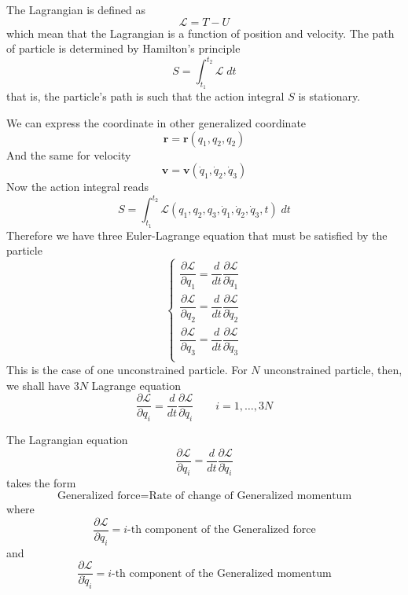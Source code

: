 \documentclass[../../../main.tex]{subfiles}
\begin{document}
The Lagrangian is defined as
\begin{equation*}
  \mathcal{L}=T-U
\end{equation*}
which mean that the Lagrangian is a function of position and velocity.
The path of particle is determined by Hamilton's principle
\begin{equation*}
  S=\int_{t_1}^{t_2}\mathcal{L}\;dt
\end{equation*}
that is, the particle's path is such that the action integral $S$ is stationary.

We can express the coordinate in other generalized coordinate
\begin{equation*}
  \mathbf{r}=\mathbf{r}(q_1,q_2,q_2)
\end{equation*}
And the same for velocity
\begin{equation*}
  \mathbf{v}=\mathbf{v}(\dot{q}_1,\dot{q}_2,\dot{q}_3)
\end{equation*}
Now the action integral reads
\begin{equation*}
  S=\int_{t_1}^{t_2}\mathcal{L}(q_1,q_2,q_3,\dot{q}_1,\dot{q}_2,\dot{q}_3,t)\;dt
\end{equation*}
Therefore we have three Euler-Lagrange equation that must be satisfied by the particle
\begin{equation*}
  \begin{cases}
    \dfrac{\partial \mathcal{L}}{\partial q_1}=\dfrac{d}{dt}\dfrac{\partial \mathcal{L}}{\partial \dot{q}_1} \\
    \dfrac{\partial \mathcal{L}}{\partial q_2}=\dfrac{d}{dt}\dfrac{\partial \mathcal{L}}{\partial \dot{q}_2} \\
    \dfrac{\partial \mathcal{L}}{\partial q_3}=\dfrac{d}{dt}\dfrac{\partial \mathcal{L}}{\partial \dot{q}_3} \\
  \end{cases}
\end{equation*}
This is the case of one unconstrained particle. For $N$ unconstrained particle, then, we shall have $3N$ Lagrange equation
\begin{equation*}
    \frac{\partial\mathcal{L}}{\partial q_i}=\frac{d}{dt}\frac{\partial \mathcal{L}}{\partial \dot{q}_i}\qquad i=1,\dots,3N
\end{equation*}

The Lagrangian equation 
\begin{equation*}
  \dfrac{\partial \mathcal{L}}{\partial q_i}=\dfrac{d}{dt}\dfrac{\partial \mathcal{L}}{\partial \dot{q}_i}
\end{equation*}
takes the form
\begin{equation*}
    \text{Generalized force}=\text{Rate of change of Generalized momentum}
\end{equation*}
where 
\begin{equation*}
    \frac{\partial \mathcal{L}}{\partial q_i}=i\text{-th component of the Generalized force}
\end{equation*}
and
\begin{equation*}
    \frac{\partial \mathcal{L}}{\partial \dot{q}_i}=i\text{-th component of the Generalized momentum}
\end{equation*}
\end{document}
